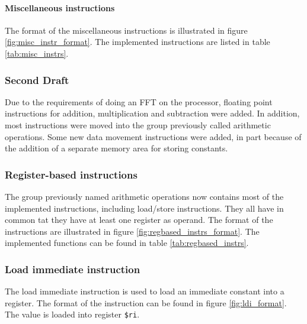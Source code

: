 


\paragraph{Miscellaneous instructions}
The format of the miscellaneous instructions is illustrated in figure
\ref{fig:misc_instr_format}. The implemented instructions are listed in table
\ref{tab:misc_instrs}.




\FloatBarrier
\subsubsection{Second Draft}

Due to the requirements of doing an FFT on the processor, floating point
instructions for addition, multiplication and subtraction were added.
In addition, most instructions were moved into the group previously called
arithmetic operations. Some new data movement instructions were added, in part
because of the addition of a separate memory area for storing constants.

\subsubsection{Register-based instructions}

The group previously named arithmetic operations now contains most of the
implemented instructions, including load/store instructions. They all have
in common tat they have at least one register as operand. The format of the
instructions are illustrated in figure \ref{fig:regbased_instrs_format}. The
implemented functions can be found in table \ref{tab:regbased_instrs}.




\subsubsection{Load immediate instruction}
The load immediate instruction is used to load an immediate constant into a
register. The format of the instruction can be found in figure
\ref{fig:ldi_format}. The value is loaded into register \texttt{\$ri}.



